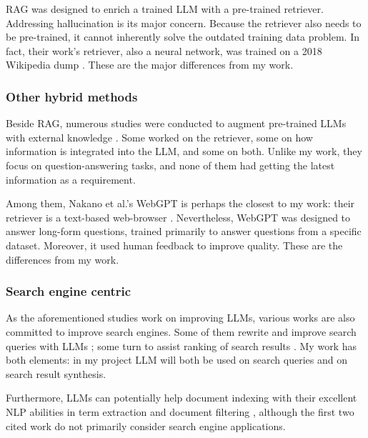 \documentclass[final-report]{report-template}
\begin{document}
RAG was designed to enrich a trained LLM with a pre-trained retriever.
Addressing hallucination is its major concern. Because the retriever also
needs to be pre-trained, it cannot inherently solve the outdated training data
problem. In fact, their work's retriever, also a neural network, was trained on
a 2018 Wikipedia dump \cite[Section 3]{rag}.  These are the major differences
from my work.

\subsubsection{Other hybrid methods}
Beside RAG, numerous studies were conducted to augment pre-trained LLMs with
external knowledge \cite{hybrid.method.1, hybrid.method.2, hybrid.method.3,
hybrid.method.4, webgpt}.
Some worked on the retriever, some on how information is integrated into the
LLM, and some on both. Unlike my work, they focus on question-answering
tasks, and none of them had getting the latest information as a requirement.

Among them, Nakano et al.'s WebGPT is perhaps the closest to my work: their
retriever is a text-based web-browser \cite{webgpt}. Nevertheless, WebGPT was
designed to answer long-form questions, trained primarily to answer questions
from a specific dataset. Moreover, it used human feedback to improve quality.
These are the differences from my work.

\subsubsection{Search engine centric}
As the aforementioned studies work on improving LLMs, various works are also
committed to improve search engines. Some of them rewrite and improve search
queries with LLMs \cite{query.rewriting.1, query.rewriting.2}; some turn to
assist ranking of search results \cite{search.result.rerank.1,
search.result.rerank.1}. My work has both elements: in my project LLM will both
be used on search queries and on search result synthesis.

Furthermore, LLMs can potentially help document indexing with their excellent
NLP abilities in term extraction \cite{llm.term.extraction.1,
llm.term.extraction.2} and document filtering \cite{llm.indexing.filter},
although the first two cited work do not primarily consider search engine
applications. 
\end{document}
